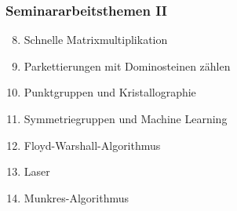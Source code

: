 %
%
%

\begin{frame}
\frametitle{Seminararbeitsthemen II}
\begin{enumerate}[<+->]
\setcounter{enumi}{7}
\item
Schnelle Matrixmultiplikation
\item
Parkettierungen mit Dominosteinen zählen
\item
Punktgruppen und Kristallographie
\item
Symmetriegruppen und Machine Learning
\item
Floyd-Warshall-Algorithmus
\item
Laser
\item
Munkres-Algorithmus
\end{enumerate}
\end{frame}


